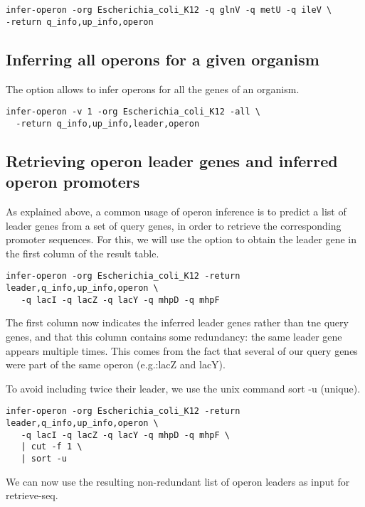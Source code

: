 \begin{lstlisting}
infer-operon -org Escherichia_coli_K12 -q glnV -q metU -q ileV \
-return q_info,up_info,operon
\end{lstlisting}

\subsection{Inferring all operons for a given organism}

The option  allows to infer operons for all the genes of
an organism.

\begin{lstlisting}
infer-operon -v 1 -org Escherichia_coli_K12 -all \
  -return q_info,up_info,leader,operon
\end{lstlisting}

\subsection{Retrieving operon leader genes and inferred
  operon promoters}

As explained above, a common usage of operon inference is to predict a
list of leader genes from a set of query genes, in order to retrieve
the corresponding promoter sequences. For this, we will use the option
\option{-return} to obtain the leader gene in the first column of the
result table. 

\begin{lstlisting}
infer-operon -org Escherichia_coli_K12 -return leader,q_info,up_info,operon \
   -q lacI -q lacZ -q lacY -q mhpD -q mhpF
\end{lstlisting}

The first column now indicates the inferred leader genes rather than
tne query genes, and that this column contains some redundancy: the
same leader gene appears multiple times. This comes from the fact that
several of our query genes were part of the same operon (e.g.:lacZ and
lacY).

To avoid including twice their leader, we use the unix command sort -u
(unique).


\begin{lstlisting}
infer-operon -org Escherichia_coli_K12 -return leader,q_info,up_info,operon \
   -q lacI -q lacZ -q lacY -q mhpD -q mhpF \
   | cut -f 1 \
   | sort -u 
\end{lstlisting}

We can now use the resulting non-redundant list of operon leaders as
input for retrieve-seq.

